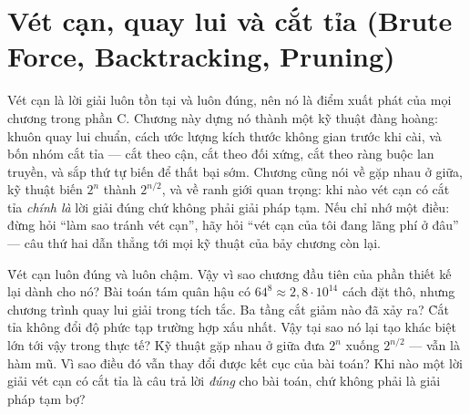 \documentclass[../../algorithm.tex]{subfiles}
\begin{document}
\chapter{Vét cạn, quay lui và cắt tỉa (Brute Force, Backtracking, Pruning)}

\begin{tomtat}
Vét cạn là lời giải luôn tồn tại và luôn đúng, nên nó là điểm xuất phát của mọi chương trong phần C. Chương này dựng nó thành một kỹ thuật đàng hoàng: khuôn quay lui chuẩn, cách ước lượng kích thước không gian trước khi cài, và bốn nhóm cắt tỉa --- cắt theo cận, cắt theo đối xứng, cắt theo ràng buộc lan truyền, và sắp thứ tự biến để thất bại sớm. Chương cũng nói về gặp nhau ở giữa, kỹ thuật biến \(2^n\) thành \(2^{n/2}\), và về ranh giới quan trọng: khi nào vét cạn có cắt tỉa \emph{chính là} lời giải đúng chứ không phải giải pháp tạm. Nếu chỉ nhớ một điều: đừng hỏi ``làm sao tránh vét cạn'', hãy hỏi ``vét cạn của tôi đang lãng phí ở đâu'' --- câu thứ hai dẫn thẳng tới mọi kỹ thuật của bảy chương còn lại.
\end{tomtat}

\begin{nentang}
\end{nentang}

\begin{khoigoi}
\h{Vét cạn luôn đúng và luôn chậm. Vậy vì sao chương đầu tiên của phần thiết kế lại dành cho nó?}
\h{Bài toán tám quân hậu có \(64^8 \approx 2,8\cdot10^{14}\) cách đặt thô, nhưng chương trình quay lui giải trong tích tắc. Ba tầng cắt giảm nào đã xảy ra?}
\h{Cắt tỉa không đổi độ phức tạp trường hợp xấu nhất. Vậy tại sao nó lại tạo khác biệt lớn tới vậy trong thực tế?}
\h{Kỹ thuật gặp nhau ở giữa đưa \(2^n\) xuống \(2^{n/2}\) --- vẫn là hàm mũ. Vì sao điều đó vẫn thay đổi được kết cục của bài toán?}
\h{Khi nào một lời giải vét cạn có cắt tỉa là câu trả lời \emph{đúng} cho bài toán, chứ không phải là giải pháp tạm bợ?}
\end{khoigoi}
\end{document}
